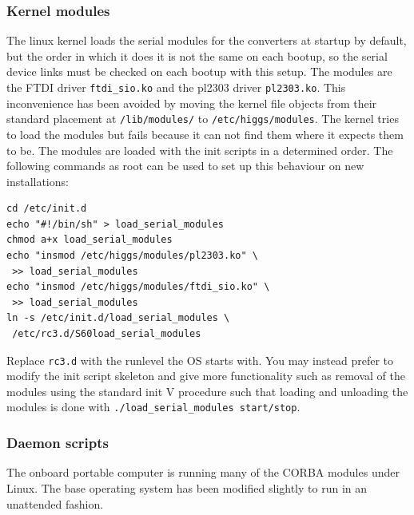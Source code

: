 \subsubsection{Kernel modules}
\label{sssec:kernel_modules}
The linux kernel loads the serial modules for the converters at startup by default, but the order in which it does it is not the same on each bootup, so the serial device links must be checked on each bootup with this setup. The modules are the FTDI driver \texttt{ftdi\_sio.ko} and the pl2303 driver \texttt{pl2303.ko}. This inconvenience has been avoided by moving the kernel file objects from their standard placement at \texttt{/lib/modules/} to \texttt{/etc/higgs/modules}. The kernel tries to load the modules but fails because it can not find them where it expects them to be. The modules are loaded with the init scripts in a determined order. The following commands as root can be used to set up this behaviour on new installations:
\begin{verbatim}
cd /etc/init.d
echo "#!/bin/sh" > load_serial_modules
chmod a+x load_serial_modules
echo "insmod /etc/higgs/modules/pl2303.ko" \
 >> load_serial_modules
echo "insmod /etc/higgs/modules/ftdi_sio.ko" \
 >> load_serial_modules
ln -s /etc/init.d/load_serial_modules \
 /etc/rc3.d/S60load_serial_modules
\end{verbatim}
Replace \texttt{rc3.d} with the runlevel the OS starts with. You may instead prefer to modify the init script skeleton and give more functionality such as removal of the modules using the standard init V procedure such that loading and unloading the modules is done with \texttt{./load\_serial\_modules start/stop}.

\subsubsection{Daemon scripts}

The onboard portable computer is running many of the CORBA modules under
Linux. The base operating system has been modified slightly to run in an
unattended fashion.

